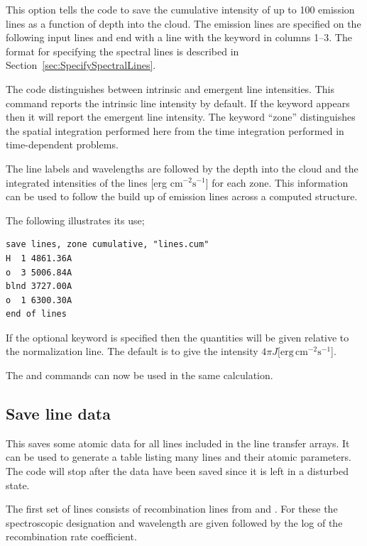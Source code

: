 This option tells the code to save the cumulative intensity
of up to 100 emission lines as a function of depth into the cloud.  The
emission lines are specified on the following input lines and end with a
line with the keyword  in columns 1--3.
The format for specifying the spectral lines is described in Section~\ref{sec:SpecifySpectralLines}.

The code distinguishes between intrinsic and emergent
line intensities.
This command reports the intrinsic line intensity by default.
If the keyword  appears then it will
report the emergent line intensity.
The keyword ``zone'' distinguishes the spatial integration performed
here from the time integration performed in time-dependent problems.

The line labels and wavelengths are followed by the depth into the cloud
and the integrated intensities of the lines [erg cm$^{-2} \mathrm{s}^{-1}$] for each zone.
This information can be used to follow the build up of emission lines across
a computed structure.

The following illustrates its use;
\begin{verbatim}
save lines, zone cumulative, "lines.cum"
H  1 4861.36A
o  3 5006.84A
blnd 3727.00A
o  1 6300.30A
end of lines
\end{verbatim}

If the optional keyword  is specified then the quantities will
be given relative to the normalization line. The default is to give
the intensity $4\pi J [\mathrm{erg\, cm}^{-2} \mathrm{s}^{-1}$].

The  and  commands can now be used in the same calculation.

\subsection{Save line data}
\label{sec:SaveLineData}


This saves some atomic data for all lines included in the line transfer
arrays.  It can be used to generate a table listing many lines and their
atomic parameters.
The code will stop after the data have been saved since
it is left in a disturbed state.

The first set of lines consists of recombination lines from \citet{Nussbaumer1984} and \citet{Pequignot1991}.  For these
the spectroscopic designation and wavelength are given followed by the log
of the recombination rate coefficient.

